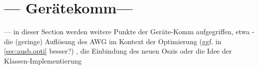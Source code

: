 \documentclass[../Report.tex]{subfiles}
\begin{document}
\section{--- Gerätekomm---}
\label{sec:ausb.geraete}
--- in dieser Section werden weitere Punkte der Geräte-Komm aufgegriffen, etwa - die (geringe) Auflösung des AWG im Kontext der Optimierung (ggf. in \ref{sec:ausb.opti} besser?) , die Einbindung des neuen Oszis oder die Idee der Klassen-Implementierung 

\end{document}
